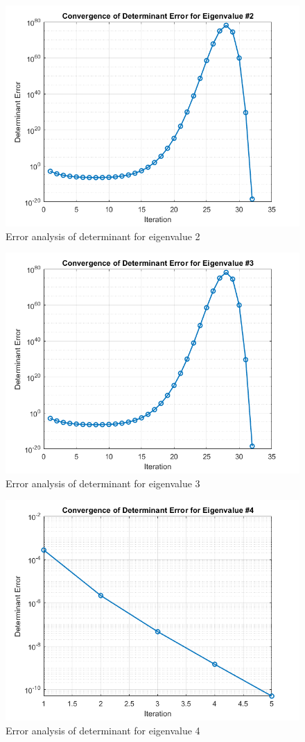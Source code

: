\begin{example}
\begin{figure}[h]
    \centering
    \includegraphics[width=.79\linewidth]{Figures/eigen_2.png}
    \caption{Error analysis of determinant for eigenvalue 2}
    \label{fig-eigenvalue2}
\end{figure}

\begin{figure}[h]
    \centering
    \includegraphics[width=.79\linewidth]{Figures/eigen_3.png}
    \caption{Error analysis of determinant for eigenvalue 3}
    \label{fig-eigenvalue3}
\end{figure}

\begin{figure}[h]
    \centering
    \includegraphics[width=.79\linewidth]{Figures/eigen_4.png}
    \caption{Error analysis of determinant for eigenvalue 4}
    \label{fig-eigenvalue4}
\end{figure}


\end{example}
